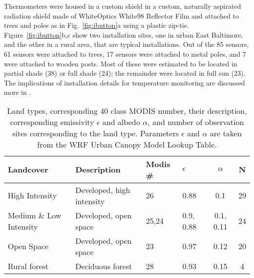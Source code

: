 Thermometers were housed in a custom shield in a custom, naturally aspirated radiation shield made of WhiteOptics White98 Reflector Film and attached to trees and poles as in Fig.~\ref{fig:ibutton}a using a plastic zip-tie. 
Figure~\ref{fig:ibutton}b,c show two installation sites, one in urban East Baltimore, and the other in a rural area, that are typical installations. 
Out of the 85 sensors, 61 sensors were attached to trees, 17 sensors were attached to metal poles, and 7 were attached to wooden posts. Most of these were estimated to be located in partial shade (38) or full shade (24); the remainder were located in full sun (23). The implications of installation details for temperature monitoring are discussed more in \cite{scott2017intraurban}.

\begin{table}
\centering
\begin{tabular}{p{2in} p{1in} l l c c}
\toprule
Landcover & Description &  Modis \# & $\epsilon$ & $\alpha$ & N  \\
\midrule
High Intensity & Developed, high intensity & 26& 0.88 &0.1 & 29 \\
Medium \& Low Intensity & Developed, open space & 25,24& 0.9, 0.88 & 0.1, 0.11& 24\\
Open Space& Developed, open space &23 & 0.97 & 0.12 & 20\\
Rural forest&Deciduous forest & 28& 0.93& 0.15& 4\\
\bottomrule
\end{tabular}
\caption{Land types, corresponding 40 class MODIS number, their description, corresponding emissivity $\epsilon$ and albedo $\alpha$, and number of observation sites corresponding to the land type. Parameters $\epsilon$ and $\alpha$ are taken from the WRF Urban Canopy Model Lookup Table.}
\label{tab:lcc}
\end{table}


